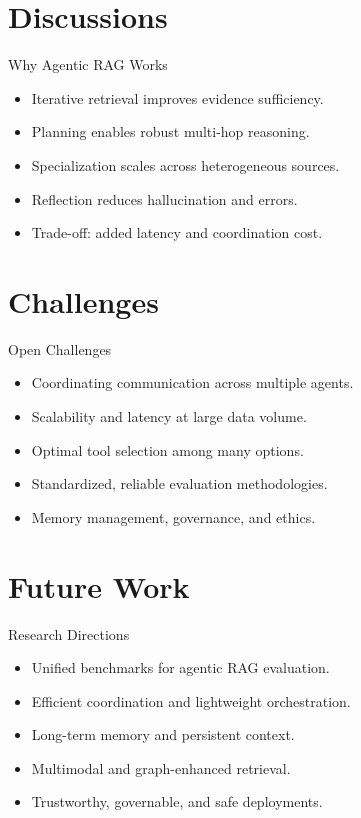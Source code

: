 \documentclass{beamer}
\begin{document}
\section{Discussions}
\begin{frame}{Why Agentic RAG Works}
\begin{itemize}
\item Iterative retrieval improves evidence sufficiency.
\item Planning enables robust multi-hop reasoning.
\item Specialization scales across heterogeneous sources.
\item Reflection reduces hallucination and errors.
\item Trade-off: added latency and coordination cost.
\end{itemize}
\end{frame}

\section{Challenges}
\begin{frame}{Open Challenges}
\begin{itemize}
\item Coordinating communication across multiple agents.
\item Scalability and latency at large data volume.
\item Optimal tool selection among many options.
\item Standardized, reliable evaluation methodologies.
\item Memory management, governance, and ethics.
\end{itemize}
\end{frame}

\section{Future Work}
\begin{frame}{Research Directions}
\begin{itemize}
\item Unified benchmarks for agentic RAG evaluation.
\item Efficient coordination and lightweight orchestration.
\item Long-term memory and persistent context.
\item Multimodal and graph-enhanced retrieval.
\item Trustworthy, governable, and safe deployments.
\end{itemize}
\end{frame}
\end{document}
